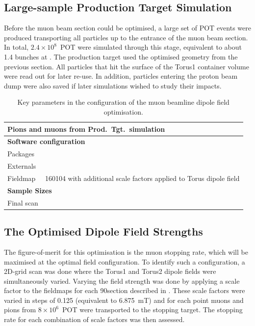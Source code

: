 \subsection{Large-sample Production Target Simulation}
Before the muon beam section could be optimised, a large set of \ac{POT} events were produced transporting all particles up to the entrance of the muon beam section.
In total, $2.4\times10^{8}$~POT were simulated through this stage, equivalent to about 1.4 bunches at \phaseII.
The production target used the optimised geometry from the previous section.
All particles that hit the surface of the Torus1 container volume were read out for later re-use.
In addition, particles entering the proton beam dump were also saved if later simulations wished to study their impacts.


\begin{table}[t]
\centering
\begin{tabular}{lp{}}
	\hline
	\multicolumn{2}{l}{\bf Pions and muons from Prod.\ Tgt.\ simulation}\\
	\hline
	\multicolumn{2}{l}{\bf Software configuration}\\
	Packages & \ttfamily{---}  \\
	Externals & \ttfamily{---}  \\
	Fieldmap & 160104 \CHECK{} with additional scale factors applied to Torus dipole field\\
	\hline
	\multicolumn{2}{l}{\bf Sample Sizes}\\
	Final scan &   \\
\hline
\end{tabular}
\caption{Key parameters in the configuration of the muon beamline dipole field optimisation.}
\end{table}

\subsection{The Optimised Dipole Field Strengths}
The figure-of-merit for this optimisation is the muon stopping rate, which will be maximised at the optimal field configuration.
To identify such a configuration, a 2D-grid scan was done where the Torus1 and Torus2 dipole fields were simultaneously varied.
Varying the field strength was done by applying a scale factor to the fieldmaps for each 90\degree section described in .
These scale factors were varied in steps of 0.125 (equivalent to 6.875~mT) and for each point muons and pions from $8\times10^6$~POT were transported to the stopping target.
The stopping rate for each combination of scale factors was then assessed.

